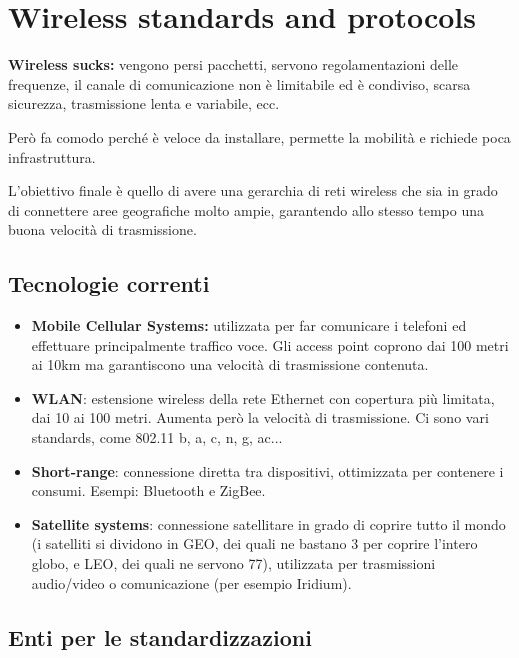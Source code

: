 \chapter{Wireless standards and protocols}
\label{wireless-standards-and-protocols}

\textbf{Wireless sucks:} vengono persi pacchetti, servono
regolamentazioni delle frequenze, il canale di comunicazione non è limitabile
ed è condiviso, scarsa sicurezza, trasmissione lenta e variabile, ecc.

Però fa comodo perché è veloce da installare, permette la mobilità e richiede
poca infrastruttura.

L'obiettivo finale è quello di avere una gerarchia di reti wireless che sia in
grado di connettere aree geografiche molto ampie, garantendo allo stesso
tempo una buona velocità di trasmissione.

\section{Tecnologie correnti}\label{tecnologie-correnti}

\begin{itemize}
\item
  \textbf{Mobile Cellular Systems:} utilizzata per far comunicare i
  telefoni ed effettuare principalmente traffico voce. Gli access point
  coprono dai 100 metri ai 10km ma garantiscono una velocità di
  trasmissione contenuta.

\item
  \textbf{WLAN}: estensione wireless della rete Ethernet con copertura
  più limitata, dai 10 ai 100 metri. Aumenta però la velocità di
  trasmissione. Ci sono vari standards, come 802.11 b, a, c, n, g, ac...
\item
  \textbf{Short-range}: connessione diretta tra dispositivi, ottimizzata
  per contenere i consumi. Esempi: Bluetooth e ZigBee.
\item
  \textbf{Satellite systems}: connessione satellitare in grado di
  coprire tutto il mondo (i satelliti si dividono in GEO, dei quali ne bastano 3
  per coprire l'intero globo, e LEO, dei quali ne servono 77), utilizzata per
  trasmissioni audio/video o comunicazione (per esempio Iridium).
\end{itemize}

\section{Enti per le standardizzazioni}\label{enti-per-le-standardizzazioni}

